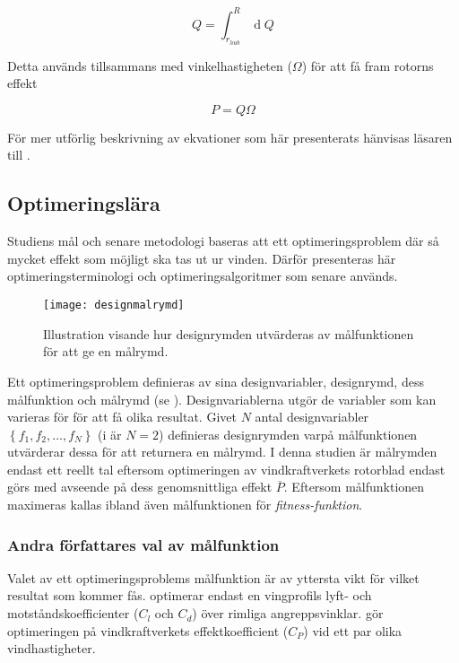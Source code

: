 \begin{equation}
Q = \int_{r_{hub}}^R \operatorname{d}\!Q
\end{equation}

Detta används tillsammans med vinkelhastigheten ($\Omega$) för att få fram rotorns effekt

\begin{equation}
P = Q \Omega
\end{equation}

För mer utförlig beskrivning av ekvationer som här presenterats hänvisas läsaren till \citet{wehb}.
  


\subsection{Optimeringslära}

Studiens mål och senare metodologi  baseras att ett optimeringsproblem där så mycket effekt som möjligt ska tas ut ur vinden. Därför presenteras här optimeringsterminologi och optimeringsalgoritmer som senare används.

\begin{figure}[!htb]
  \centering
  \texttt{[image: designmalrymd]}
  \caption{Illustration visande hur designrymden utvärderas av målfunktionen för att ge en målrymd.}
  \label{designmalrymd}
\end{figure}

Ett optimeringsproblem definieras av sina designvariabler, designrymd, dess målfunktion och målrymd (se ). Designvariablerna utgör de variabler som kan varieras för för att få olika resultat. Givet $N$ antal designvariabler $\left\{f_1, f_2, \dots, f_N\right\}$ (i  är $N=2$) definieras designrymden varpå målfunktionen utvärderar dessa för att returnera en målrymd. I denna studien är målrymden endast ett reellt tal eftersom optimeringen av vindkraftverkets rotorblad endast görs med avseende på dess genomsnittliga effekt $\overline{P}$. Eftersom målfunktionen maximeras kallas ibland även målfunktionen för \emph{fitness-funktion}.

\subsubsection{Andra författares val av målfunktion}

Valet av ett optimeringsproblems målfunktion är av yttersta vikt för vilket resultat som kommer fås. \citet{Dansken, LowRe, Grasso} optimerar endast en vingprofils lyft- och motståndskoefficienter ($C_l$ och $C_d$) över rimliga angreppsvinklar. \citet{Cencelli} gör optimeringen på vindkraftverkets effektkoefficient ($C_P$) vid ett par olika vindhastigheter. 

